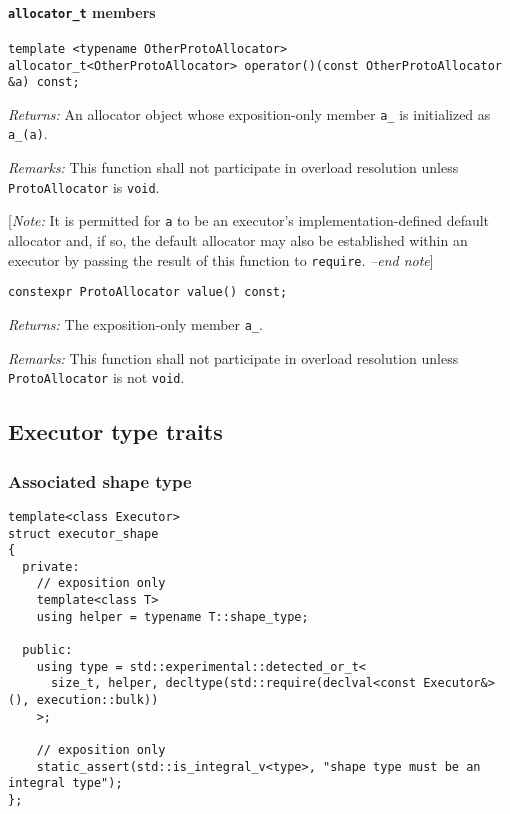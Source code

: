 \documentclass[a4paper,12pt,notitlepage,twoside,openright]{article}
\begin{document}
\hypertarget{allocator_t-members}{%
\paragraph{\texorpdfstring{\texttt{allocator_t}
members}{ members}}\label{allocator_t-members}}

\begin{verbatim}
template <typename OtherProtoAllocator>
allocator_t<OtherProtoAllocator> operator()(const OtherProtoAllocator &a) const;
\end{verbatim}

\emph{Returns:} An allocator object whose exposition-only member
\texttt{a_} is initialized as \texttt{a_(a)}.

\emph{Remarks:} This function shall not participate in overload
resolution unless \texttt{ProtoAllocator} is
\texttt{void}.

{[}\emph{Note:} It is permitted for \texttt{a} to be an
executor's implementation-defined default allocator and, if so, the
default allocator may also be established within an executor by passing
the result of this function to \texttt{require}. \emph{--end
note}{]}

\begin{verbatim}
constexpr ProtoAllocator value() const;
\end{verbatim}

\emph{Returns:} The exposition-only member \texttt{a_}.

\emph{Remarks:} This function shall not participate in overload
resolution unless \texttt{ProtoAllocator} is not
\texttt{void}.

\hypertarget{executor-type-traits}{%
\subsection{Executor type traits}\label{executor-type-traits}}

\hypertarget{associated-shape-type}{%
\subsubsection{Associated shape type}\label{associated-shape-type}}

\begin{verbatim}
template<class Executor>
struct executor_shape
{
  private:
    // exposition only
    template<class T>
    using helper = typename T::shape_type;

  public:
    using type = std::experimental::detected_or_t<
      size_t, helper, decltype(std::require(declval<const Executor&>(), execution::bulk))
    >;

    // exposition only
    static_assert(std::is_integral_v<type>, "shape type must be an integral type");
};
\end{verbatim}
\end{document}
